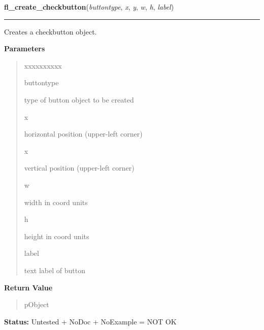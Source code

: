     \label{xformslib:library:fl_create_checkbutton}

    \vspace{0.5ex}

\hspace{.8\funcindent}\begin{boxedminipage}{\funcwidth}

    \raggedright \textbf{fl\_create\_checkbutton}(\textit{buttontype}, \textit{x}, \textit{y}, \textit{w}, \textit{h}, \textit{label})

    \vspace{-1.5ex}

    \rule{\textwidth}{0.5\fboxrule}
\setlength{\parskip}{2ex}
    Creates a checkbutton object.

\setlength{\parskip}{1ex}
      \textbf{Parameters}
      \vspace{-1ex}

      \begin{quote}
        \begin{Ventry}{xxxxxxxxxx}

          \item[buttontype]

          type of button object to be created

          \item[x]

          horizontal position (upper-left corner)

          \item[x]

          vertical position (upper-left corner)

          \item[w]

          width in coord units

          \item[h]

          height in coord units

          \item[label]

          text label of button

        \end{Ventry}

      \end{quote}

      \textbf{Return Value}
    \vspace{-1ex}

      \begin{quote}
      pObject

      \end{quote}

\textbf{Status:} Untested + NoDoc + NoExample = NOT OK



    \end{boxedminipage}

